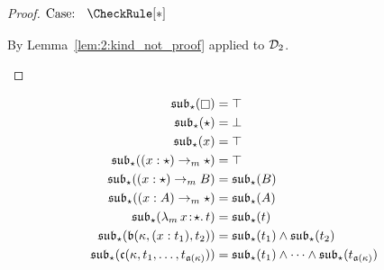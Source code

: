 \begin{proof}
    $\text{Case: }\begin{array}{c} \CheckRule[*] \end{array}$
    \begin{proofcase}
        By Lemma~\ref{lem:2:kind_not_proof} applied to $\mathcal{D}_{2}$.
    \end{proofcase}
\end{proof}

\newcommand{\substar}{\mathfrak{sub}_\star}

\begin{align*}
    \substar(\kind) &= \top \\
    \substar(\star) &= \bot \\
    \substar(x) &= \top \\
    \substar((x : \star) \to_m \star) &= \top \\
    \substar((x : \star) \to_m B) &= \substar(B) \\
    \substar((x : A) \to_m \star) &= \substar(A) \\
    \substar(\abs{\lambda_m}{x}{\star}{t}) &= \substar(t) \\
    \substar(\mathfrak{b}(\kappa, (x : t_1), t_2)) &= \substar(t_1) \wedge \substar(t_2) \\
    \substar(\mathfrak{c}(\kappa, t_1, \ldots, t_{\mathfrak{a}(\kappa)})) &= \substar(t_1) \wedge \cdots \wedge \substar(t_{\mathfrak{a}(\kappa)})
\end{align*}

